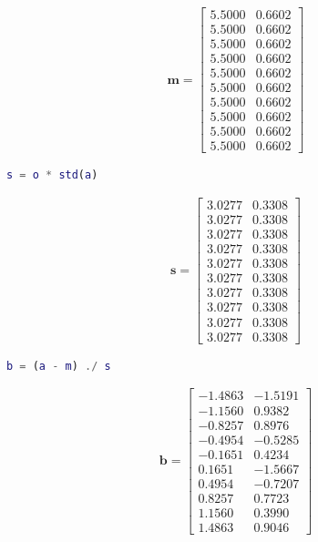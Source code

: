 \begin{solution}
    \begin{align*}
        \boldsymbol{m} = \begin{bmatrix}
            5.5000 & 0.6602 \\
            5.5000 & 0.6602 \\
            5.5000 & 0.6602 \\
            5.5000 & 0.6602 \\
            5.5000 & 0.6602 \\
            5.5000 & 0.6602 \\
            5.5000 & 0.6602 \\
            5.5000 & 0.6602 \\
            5.5000 & 0.6602 \\
            5.5000 & 0.6602
        \end{bmatrix}
    \end{align*}    
    
    \begin{lstlisting}[language=Matlab]
s = o * std(a)
    \end{lstlisting}
    
    \begin{align*}
        \boldsymbol{s} = \begin{bmatrix}
            3.0277 & 0.3308 \\
            3.0277 & 0.3308 \\
            3.0277 & 0.3308 \\
            3.0277 & 0.3308 \\
            3.0277 & 0.3308 \\
            3.0277 & 0.3308 \\
            3.0277 & 0.3308 \\
            3.0277 & 0.3308 \\
            3.0277 & 0.3308 \\
            3.0277 & 0.3308
        \end{bmatrix}
    \end{align*}    
    
    \begin{lstlisting}[language=Matlab]
b = (a - m) ./ s
    \end{lstlisting}
    
    \begin{align*}
        \boldsymbol{b} = \begin{bmatrix}
           -1.4863 & -1.5191 \\
           -1.1560 &  0.9382 \\
           -0.8257 &  0.8976 \\
           -0.4954 & -0.5285 \\
           -0.1651 &  0.4234 \\
            0.1651 & -1.5667 \\
            0.4954 & -0.7207 \\
            0.8257 &  0.7723 \\
            1.1560 &  0.3990 \\
            1.4863 &  0.9046
        \end{bmatrix}
    \end{align*}    
    

\end{solution}
